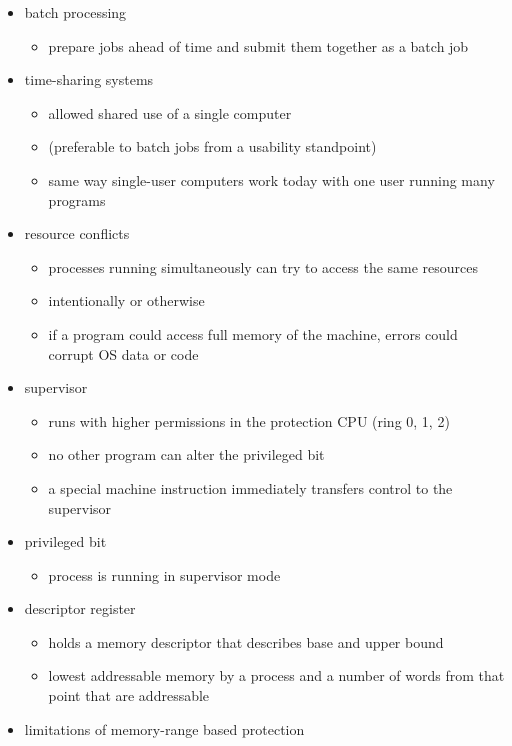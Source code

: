\documentclass[
  12pt]{findlay}
\providecommand{\tightlist}{%
  \setlength{\itemsep}{0pt}\setlength{\parskip}{0pt}}
\begin{document}
\begin{itemize}
\tightlist
\item
  batch processing

  \begin{itemize}
  \tightlist
  \item
    prepare jobs ahead of time and submit them together as a batch job
  \end{itemize}
\item
  time-sharing systems

  \begin{itemize}
  \tightlist
  \item
    allowed shared use of a single computer
  \item
    (preferable to batch jobs from a usability standpoint)
  \item
    same way single-user computers work today with one user running many
    programs
  \end{itemize}
\item
  resource conflicts

  \begin{itemize}
  \tightlist
  \item
    processes running simultaneously can try to access the same
    resources
  \item
    intentionally or otherwise
  \item
    if a program could access full memory of the machine, errors could
    corrupt OS data or code
  \end{itemize}
\item
  supervisor

  \begin{itemize}
  \tightlist
  \item
    runs with higher permissions in the protection CPU (ring 0, 1, 2)
  \item
    no other program can alter the privileged bit
  \item
    a special machine instruction immediately transfers control to the
    supervisor
  \end{itemize}
\item
  privileged bit

  \begin{itemize}
  \tightlist
  \item
    process is running in supervisor mode
  \end{itemize}
\item
  descriptor register

  \begin{itemize}
  \tightlist
  \item
    holds a memory descriptor that describes base and upper bound
  \item
    lowest addressable memory by a process and a number of words from
    that point that are addressable
  \end{itemize}
\item
  limitations of memory-range based protection


\end{itemize}
\end{document}

